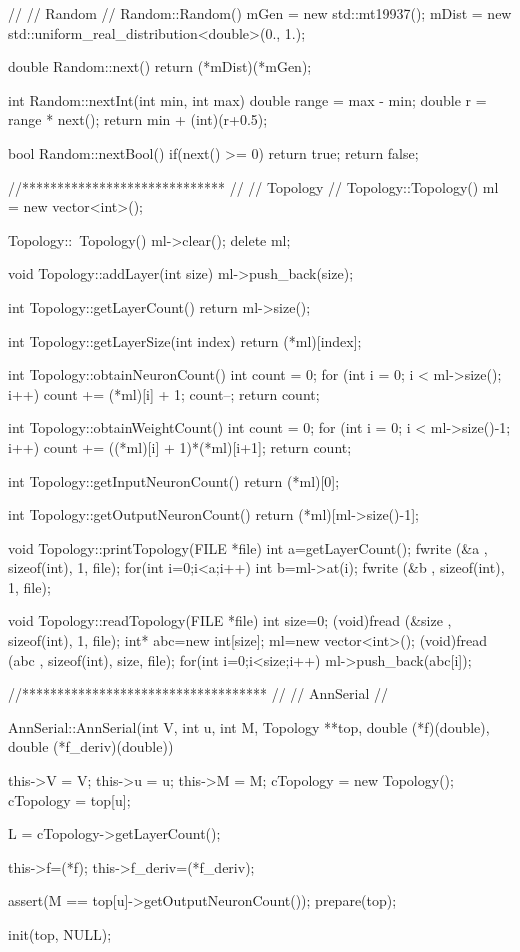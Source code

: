//
// Random
//
Random::Random(){
  mGen = new std::mt19937();
  mDist = new std::uniform\_real\_distribution<double>(0., 1.);
}

double Random::next(){
  return (*mDist)(*mGen);
}

int Random::nextInt(int min, int max){
  double range = max - min;
  double r = range * next();
  return min + (int)(r+0.5);
}

bool Random::nextBool(){
  if(next() >= 0) return true;
  return false;
}

//*****************************
//
// Topology
//
Topology::Topology(){
	ml = new vector<int>();
}

Topology::~Topology(){
	ml->clear();
	delete ml;
}

void Topology::addLayer(int size){
	ml->push\_back(size);
}

int Topology::getLayerCount(){
	return ml->size();
}

int Topology::getLayerSize(int index){
	return (*ml)[index];
}

int Topology::obtainNeuronCount(){
	int count = 0;
	for (int i = 0; i < ml->size(); i++)
		count += (*ml)[i] + 1;
  count--;
	return count;
}

int Topology::obtainWeightCount(){
	int count = 0;
	for (int i = 0; i < ml->size()-1; i++)
		count += ((*ml)[i] + 1)*(*ml)[i+1];
	return count;
}

int Topology::getInputNeuronCount(){
	return (*ml)[0];
}

int Topology::getOutputNeuronCount(){
	return (*ml)[ml->size()-1];
}

void Topology::printTopology(FILE *file){
  int a=getLayerCount();
  fwrite (\&a , sizeof(int), 1, file);
  for(int i=0;i<a;i++){
    int b=ml->at(i);
    fwrite (\&b , sizeof(int), 1, file);
  }
}

void Topology::readTopology(FILE *file){
  int size=0;
  (void)fread (\&size , sizeof(int), 1, file);
  int* abc=new int[size];
  ml=new vector<int>();
  (void)fread (abc , sizeof(int), size, file);
  for(int i=0;i<size;i++){
    ml->push\_back(abc[i]);
  }
}



//***********************************
//
// AnnSerial
//

AnnSerial::AnnSerial(int V, int u, int M, Topology **top, double (*f)(double), double (*f\_deriv)(double)){
  this->V = V;
  this->u = u;
  this->M = M;
  cTopology = new Topology();
    cTopology = top[u];

  L = cTopology->getLayerCount();

  this->f=(*f);
  this->f\_deriv=(*f\_deriv);

  assert(M == top[u]->getOutputNeuronCount());
  prepare(top);

  init(top, NULL);
}

